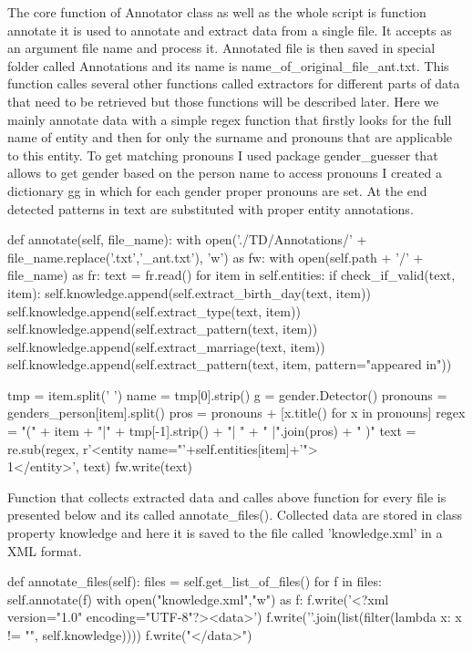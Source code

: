 \documentclass[a4paper]{article}
\begin{document}
The core function of Annotator class as well as the whole script is function annotate it is used to annotate and extract data from a single file. It accepts as an argument file name and process it. Annotated file is then saved in special folder called Annotations and its name is name\_of\_original\_file\_ant.txt. This function calles several other functions called extractors for different parts of data that need to be retrieved but those functions will be described later. Here we mainly annotate data with a simple regex function \cite{regex}  that firstly looks for the full name of entity and then for only the surname and pronouns that are applicable to this entity. To get matching pronouns I used package gender\_guesser that allows to get gender based on the person name to access pronouns I created a dictionary gg in which for each gender proper pronouns are set. At the end detected patterns in text are substituted with proper entity annotations.
\begin{python}
    def annotate(self, file_name):
        with open('./TD/Annotations/' + file_name.replace('.txt','_ant.txt'), 'w') as fw:
            with open(self.path + '/' + file_name) as fr:
                text = fr.read()
                for item in self.entities:
                    if check_if_valid(text, item):
                        self.knowledge.append(self.extract_birth_day(text, item))
                        self.knowledge.append(self.extract_type(text, item))
                        self.knowledge.append(self.extract_pattern(text, item))
                        self.knowledge.append(self.extract_marriage(text, item))
                        self.knowledge.append(self.extract_pattern(text, item, pattern="appeared in"))

                        tmp = item.split(' ')
                        name = tmp[0].strip()
                        g = gender.Detector()
                        pronouns = genders_person[item].split()
                        pros = pronouns + [x.title() for x in pronouns]
                        regex = "(" + item + "|" + tmp[-1].strip() + "| " + " |".join(pros)  + " )"
                        text = re.sub(regex, r'<entity name="'+self.entities[item]+'">\\1</entity>', text)
            fw.write(text)

\end{python}

Function that collects extracted data and calles above function for every file is presented below and its called annotate\_files(). Collected data are stored in class property knowledge and here it is saved to the file called 'knowledge.xml' in a XML format.
\begin{python}
    def annotate_files(self):
        files = self.get_list_of_files()
        for f in files:
            self.annotate(f)
        with open("knowledge.xml","w") as f:
            f.write('<?xml version="1.0" encoding="UTF-8"?>\n<data>')
            f.write('\n'.join(list(filter(lambda x: x != "", self.knowledge))))
            f.write("</data>")

\end{python}
\end{document}
